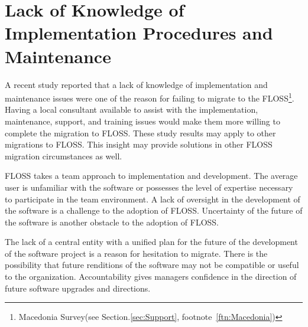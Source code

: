   \section{Lack of Knowledge of Implementation Procedures and Maintenance}

  A recent study reported that a lack of knowledge of implementation and maintenance issues were one of the reason for failing to migrate to the FLOSS\footnote{Macedonia Survey(see Section.\ref{sec:Support}, footnote~\ref{ftn:Macedonia})}. 
  Having a local consultant available to assist with the implementation, maintenance, support, and training issues would make them more willing to complete the migration to FLOSS. These study results may apply to other migrations to FLOSS. This insight may provide solutions in other FLOSS migration circumstances as well.  

  FLOSS takes a team approach to implementation and development. The average user is unfamiliar with the software or possesses the level of expertise necessary to participate in the team environment.
  A lack of oversight in the development of the software is a challenge to the adoption of FLOSS. Uncertainty of the future of the software is another obstacle to the adoption of FLOSS. 

  The lack of a central entity with a unified plan for the future of the development of the software project is a reason for hesitation to migrate.
  There is the possibility that future renditions of the software may not be compatible or useful to the organization.
  Accountability gives managers confidence in the direction of future software upgrades and directions. 
 


